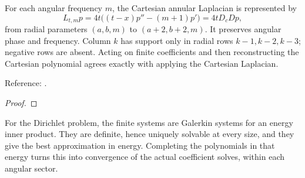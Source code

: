 
\begin{theorem}
\label{thm:zernike-annulus-laplacian}
\leanok
For each angular frequency $m$, the Cartesian annular Laplacian is represented by
\[
 L_{t,m}p=4t\bigl((t-x)p''-(m+1)p'\bigr)=4tD_cDp,
\]
from radial parameters $(a,b,m)$ to $(a+2,b+2,m)$. It preserves angular phase
and frequency. Column $k$ has support only in radial rows $k-1,k-2,k-3$;
negative rows are absent. Acting on finite coefficients and then reconstructing
the Cartesian polynomial agrees exactly with applying the Cartesian Laplacian.


Reference: \cite[Proposition 4.5, equation (4.13)]{pgso}.
\end{theorem}
\begin{proof}
\leanok
\end{proof}


For the Dirichlet problem, the finite systems are Galerkin systems for an energy
inner product. They are definite, hence uniquely solvable at every size, and they
give the best approximation in energy. Completing the polynomials in that energy
turns this into convergence of the actual coefficient solves, within each angular
sector.

